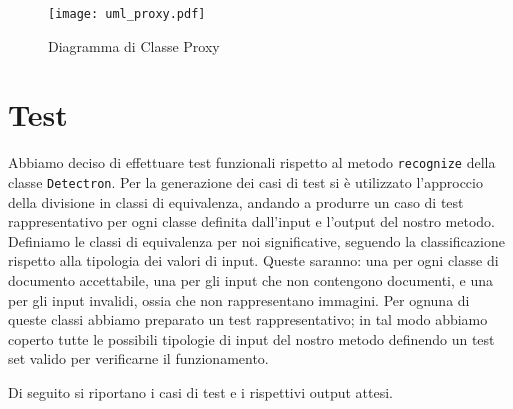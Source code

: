 \documentclass[12pt,a4paper]{article}
\begin{document}
\begin{figure}[H]
    \caption{Diagramma di Classe Proxy}
    \centering
    \texttt{[image: uml\_proxy.pdf]}
\end{figure}

\section{Test}

Abbiamo deciso di effettuare test funzionali rispetto al metodo
\texttt{recognize} della classe \texttt{Detectron}. Per la generazione
dei casi di test si è utilizzato l'approccio della divisione in classi
di equivalenza, andando a produrre un caso di test rappresentativo per
ogni classe definita dall'input e l'output del nostro metodo. Definiamo
le classi di equivalenza per noi significative, seguendo la
classificazione rispetto alla tipologia dei valori di input. Queste
saranno: una per ogni classe di documento accettabile, una per gli input
che non contengono documenti, e una per gli input invalidi, ossia che
non rappresentano immagini. Per ognuna di queste classi abbiamo
preparato un test rappresentativo; in tal modo abbiamo coperto tutte le
possibili tipologie di input del nostro metodo definendo un test set
valido per verificarne il funzionamento.

Di seguito si riportano i casi di test e i rispettivi output attesi.
\end{document}
